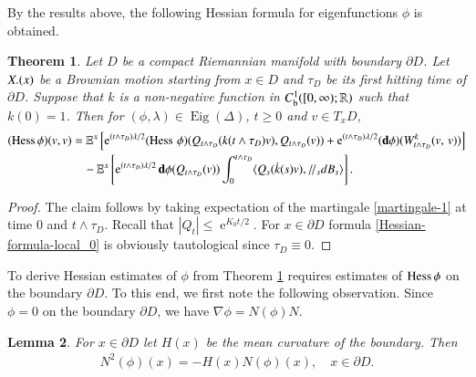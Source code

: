 \documentclass[11pt,reqno]{amsart}
\newtheorem{theorem}{Theorem}[section]
\newtheorem{lemma}[theorem]{Lemma}
\theoremstyle{definition} \newtheorem{remark}[theorem]{Remark}
\numberwithin{equation}{section}
\newcommand\1{\mathbbm{1}}
\def\Eig{\operatorname{Eig}} \def\II{{\operatorname{II}}}
\def\bd{{\bf d}}
\def\r{\right}
\def\l{\left} \def\e{\operatorname{e}} \def\dsum{\displaystyle\sum}
\newcommand{\ptr}{/\!/}
\def\II{{\operatorname{II}}}
\begin{document}
By the results above, the following Hessian formula for eigenfunctions
$\phi$ is obtained.

\begin{theorem}\label{th0}
Let $D$ be a compact Riemannian manifold with
  boundary $\partial D$. Let $X{\bf.}(x)$ be a Brownian motion starting
  from $x\in D$ and $\tau_D$ be its first hitting time of $\partial D$.
Suppose that $k$ is a  non-negative function in $C^1_\text{b}([0,\infty);\mathbb{R})$
such that $k(0)=1$. Then for $(\phi,\lambda)\in \Eig(\Delta)$, $t\geq 0$ and
$v\in T_xD$, 
\begin{align}\label{Hessian-formula-local_0}
(\Hess \phi)(v,v)&=\E^x\l[\e^{(t\wedge \tau_D)\lambda/2}(\Hess \,\phi)(Q_{t\wedge \tau_D}(k(t\wedge \tau_D)v), Q_{t\wedge \tau_D}(v))+\e^{(t\wedge \tau_D)\lambda/2}({\bf d} \phi)
(W^k_{t\wedge \tau_D}(v,\,v))\r] \notag\\
&\quad-\E^x\l[\e^{(t\wedge \tau_D)\lambda/2}\bd \phi(Q_{t\wedge \tau_D}(v))\int_0^{t\wedge \tau_D}\langle Q_s(\dot{k}(s)v),
\ptr_sd  B_s \rangle\r].
\end{align}
\end{theorem}

\begin{proof}
  
The claim follows by taking expectation of the martingale \eqref{martingale-1}
at time $0$ and $t\wedge \tau_D$. Recall that $|Q_t|\leq \e^{K_0t/2}$.
For $x\in\partial D$ formula \eqref{Hessian-formula-local_0} is obviously
tautological since $\tau_D\equiv 0$.
\end{proof}

To derive Hessian estimates of $\phi$ from Theorem \ref{th0} requires estimates of
$\operatorname{Hess}\phi$ on the boundary $\partial D$.
To this end, we first note the following observation. Since $\phi=0$ on the boundary $\partial D$, 
we have $\nabla\phi=N(\phi)N$.

\begin{lemma}\label{lem0}
For $x\in \partial D$ let $H(x)$ be the mean curvature of the boundary. Then
\begin{align*}
N^2(\phi)(x)=-H(x)N(\phi)(x),\quad x\in \partial D.
\end{align*}
\end{lemma}
\end{document}
